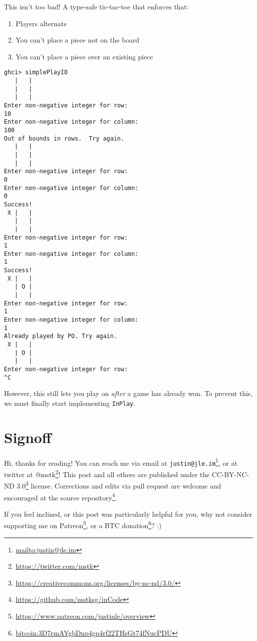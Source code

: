 \documentclass[]{article}
\renewcommand{\href}[2]{#2\footnote{\url{#1}}}
\begin{document}
This isn't too bad! A type-safe tic-tac-toe that enforces that:

\begin{enumerate}
\def\labelenumi{\arabic{enumi}.}
\tightlist
\item
  Players alternate
\item
  You can't place a piece not on the board
\item
  You can't place a piece over an existing piece
\end{enumerate}

\begin{verbatim}
ghci> simplePlayIO
   |   |
   |   |
   |   |
Enter non-negative integer for row:
10
Enter non-negative integer for column:
100
Out of bounds in rows.  Try again.
   |   |
   |   |
   |   |
Enter non-negative integer for row:
0
Enter non-negative integer for column:
0
Success!
 X |   |
   |   |
   |   |
Enter non-negative integer for row:
1
Enter non-negative integer for column:
1
Success!
 X |   |
   | O |
   |   |
Enter non-negative integer for row:
1
Enter non-negative integer for column:
1
Already played by PO. Try again.
 X |   |
   | O |
   |   |
Enter non-negative integer for row:
^C
\end{verbatim}

However, this still lets you play on \emph{after} a game has already won. To
prevent this, we must finally start implementing \texttt{InPlay}.

\hypertarget{signoff}{%
\section{Signoff}\label{signoff}}

Hi, thanks for reading! You can reach me via email at
\href{mailto:justin@jle.im}{\nolinkurl{justin@jle.im}}, or at twitter at
\href{https://twitter.com/mstk}{@mstk}! This post and all others are published
under the \href{https://creativecommons.org/licenses/by-nc-nd/3.0/}{CC-BY-NC-ND
3.0} license. Corrections and edits via pull request are welcome and encouraged
at \href{https://github.com/mstksg/inCode}{the source repository}.

If you feel inclined, or this post was particularly helpful for you, why not
consider \href{https://www.patreon.com/justinle/overview}{supporting me on
Patreon}, or a \href{bitcoin:3D7rmAYgbDnp4gp4rf22THsGt74fNucPDU}{BTC donation}?
:)
\end{document}
